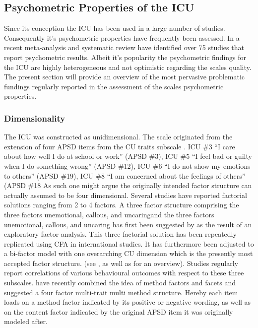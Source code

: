 \subsection{Psychometric Properties of the ICU}
Since its conception the ICU has been used in a large number of studies.
Consequently it's psychometric properties have frequently been assessed.
In a recent meta-analysis and systematic review \textcites{cardinale_reliability_2017}
have identified over 75 studies that report psychometric results.
Albeit it's popularity the psychometric findings for the ICU are highly heterogeneous and not optimistic regarding the scales quality.
The present section will provide an overview of the most pervasive problematic fundings regularly reported in the assessment of the scales psychometric properties. 

\subsubsection{Dimensionality}
The ICU was constructed as unidimensional.
The scale originated from the extension of four APSD items from the CU traits subscale \parencite{kimonis_using_2015}.
ICU \#3  “I care about how well I do at school or work” (APSD \#3),
ICU \#5  “I feel bad or guilty when I do something wrong” (APSD \#12),
ICU \#6 “I do not show my emotions to others” (APSD \#19),
ICU \#8  “I am concerned about the feelings of others” (APSD \#18
As such one might argue the originally intended factor structure can actually assumed to be four dimensional.
Several studies have reported factorial solutions ranging from 2 to 4 factors. 
A three factor structure comprising the three factors unemotional, callous, and uncaringand the three factors unemotional, callous, and uncaring has first been suggested by \textcites{essau_callous-unemotional_2006}  
as the result of an exploratory factor analysis. 
This three factorial solution has been repeatedly replicated using CFA in international studies. It has furthermore been adjusted to a bi-factor model
with one overarching CU dimension  which is the presently most accepted factor structure.
(see \textcites{cardinale_reliability_2017}, as well as \textcites{kliem_factor_2019} for an overview).
Studies regularly report correlations of various behavioural outcomes with respect to these three subscales.
\textcites{kliem_factor_2019} have recently combined the idea of method factors and facets and suggested a four factor multi-trait multi method structure.
Hereby each item loads on a method factor indicated by its positive or negative wording, as well as on the content factor indicated by the original APSD item it was originally modeled after.

